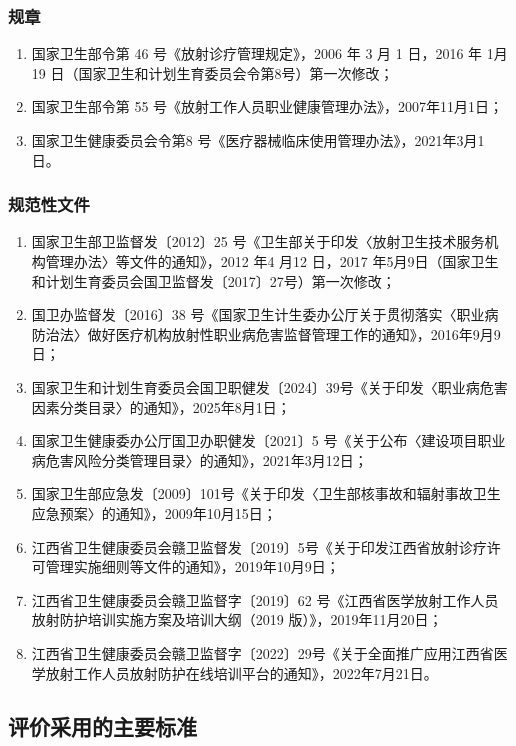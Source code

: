 \subsubsection{规章}

\begin{enumerate}
\item 国家卫生部令第 46 号《放射诊疗管理规定》，2006 年 3 月 1 日，2016 年 1月 19 日（国家卫生和计划生育委员会令第8号）第一次修改；
\item 国家卫生部令第 55 号《放射工作人员职业健康管理办法》，2007年11月1日；
\item 国家卫生健康委员会令第8 号《医疗器械临床使用管理办法》，2021年3月1日。
\end{enumerate}

\subsubsection{规范性文件}

\begin{enumerate}
\item 国家卫生部卫监督发〔2012〕25 号《卫生部关于印发〈放射卫生技术服务机构管理办法〉等文件的通知》，2012 年4 月12 日，2017 年5月9日（国家卫生和计划生育委员会国卫监督发〔2017〕27号）第一次修改；
\item 国卫办监督发〔2016〕38 号《国家卫生计生委办公厅关于贯彻落实〈职业病防治法〉做好医疗机构放射性职业病危害监督管理工作的通知》，2016年9月9日；
\item 国家卫生和计划生育委员会国卫职健发〔2024〕39号《关于印发〈职业病危害因素分类目录〉的通知》，2025年8月1日；
\item 国家卫生健康委办公厅国卫办职健发〔2021〕5 号《关于公布〈建设项目职业病危害风险分类管理目录〉的通知》，2021年3月12日；
\item 国家卫生部应急发〔2009〕101号《关于印发〈卫生部核事故和辐射事故卫生应急预案〉的通知》，2009年10月15日；
\item 江西省卫生健康委员会赣卫监督发〔2019〕5号《关于印发江西省放射诊疗许可管理实施细则等文件的通知》，2019年10月9日；
\item 江西省卫生健康委员会赣卫监督字〔2019〕62 号《江西省医学放射工作人员放射防护培训实施方案及培训大纲（2019 版）》，2019年11月20日；
\item 江西省卫生健康委员会赣卫监督字〔2022〕29号《关于全面推广应用江西省医学放射工作人员放射防护在线培训平台的通知》，2022年7月21日。
\end{enumerate}

\subsection{评价采用的主要标准}


